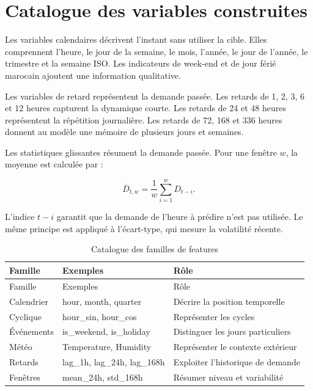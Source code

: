 \documentclass[12pt,a4paper]{report}
\begin{document}
\section{Catalogue des variables construites}

Les variables calendaires décrivent l'instant sans utiliser la cible. Elles
comprennent l'heure, le jour de la semaine, le mois, l'année, le jour de
l'année, le trimestre et la semaine ISO. Les indicateurs de week-end et de
jour férié marocain ajoutent une information qualitative.

Les variables de retard représentent la demande passée. Les retards de 1, 2,
3, 6 et 12 heures capturent la dynamique courte. Les retards de 24 et
48 heures représentent la répétition journalière. Les retards de 72, 168 et
336 heures donnent au modèle une mémoire de plusieurs jours et semaines.

Les statistiques glissantes résument la demande passée. Pour une fenêtre $w$,
la moyenne est calculée par :

\begin{equation}
\overline{D}_{t,w} = \frac{1}{w}\sum_{i=1}^{w}D_{t-i}.
\end{equation}

L'indice $t-i$ garantit que la demande de l'heure à prédire n'est pas utilisée.
Le même principe est appliqué à l'écart-type, qui mesure la volatilité récente.

\begin{longtable}{p{} p{} p{}}
\caption{Catalogue des familles de features}\label{tab:catalogue-features}\\
\toprule
Famille & Exemples & Rôle \\
\midrule
\endfirsthead
\toprule
Famille & Exemples & Rôle \\
\midrule
\endhead
Calendrier & hour, month, quarter & Décrire la position temporelle \\
Cyclique & hour\_sin, hour\_cos & Représenter les cycles \\
Événements & is\_weekend, is\_holiday & Distinguer les jours particuliers \\
Météo & Temperature, Humidity & Représenter le contexte extérieur \\
Retards & lag\_1h, lag\_24h, lag\_168h & Exploiter l'historique de demande \\
Fenêtres & mean\_24h, std\_168h & Résumer niveau et variabilité \\
\bottomrule
\end{longtable}
\end{document}

